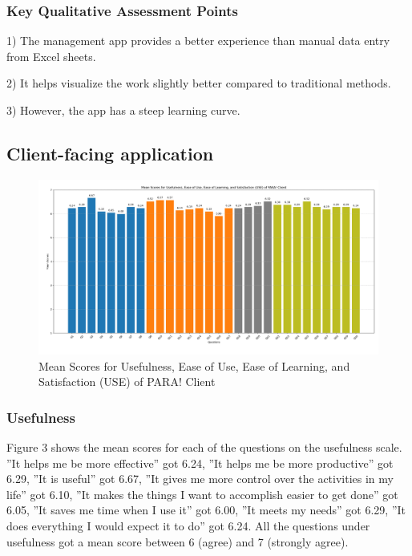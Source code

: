 \documentclass[journal]{./IEEE/IEEEtran}
\begin{document}
\subsubsection{Key Qualitative Assessment Points}
\begin{description}
    \item 1) The management app provides a better experience than manual data entry from Excel sheets.
    \item 2) It helps visualize the work slightly better compared to traditional methods.
    \item 3) However, the app has a steep learning curve.
\end{description}

\subsection{Client-facing application}
\begin{figure}[h]
    \centering
        \includegraphics[scale=0.18]{./figures/client means.png}
    \caption{Mean Scores for Usefulness, Ease of Use, Ease of Learning, and Satisfaction (USE) of PARA! Client}
\end{figure}


\subsubsection{Usefulness}
Figure 3 shows the mean scores for each of the questions on the usefulness scale.
”It helps me be more effective” got 6.24, ”It helps me be more productive” got 6.29, ”It is useful” got 6.67, ”It gives me more control over the activities in my life” got 6.10, ”It makes the things I want to accomplish easier to get done” got 6.05, ”It saves me time when I use it” got 6.00, ”It meets my needs” got 6.29, ”It does everything I would expect it to do” got 6.24.
All the questions under usefulness got a mean score between 6 (agree) and 7 (strongly agree).
\end{document}
